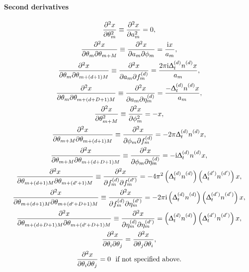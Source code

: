 \paragraph{Second derivatives}
\begin{subequations}
    \begin{gather}
        \xderivtwosame{\theta_{m}} \equiv
            \xderivtwosame{a_m} =
            0,
            \label{eq:amp-second-deriv}\\
        \xderivtwodiff{\theta_{m}}{\theta_{m + M}} \equiv
            \xderivtwodiff{a_m}{\phi_m} =
            \frac{\iu x}{a_m},\label{eq:amp-phi-second-deriv}\\
        \xderivtwodiff{\theta_{m}}{\theta_{m + (d + 1)M}} \equiv
            \xderivtwodiff{a_m^{\vphantom{(d)}}}{\fdm} =
            \frac{2 \pi \iu \Dtd \nd x}{a_m},\\
        \xderivtwodiff{\theta_{m}}{\theta_{m + (d + D + 1)M}} \equiv
            \xderivtwodiff{a_m^{\vphantom{(d)}}}{\etadm} =
            \frac{-\Dtd \nd x}{a_m},\\
        \xderivtwosame{\theta_{m + M}} \equiv
            \xderivtwosame{\phi_m} =
            -x,\\
        \xderivtwodiff{\theta_{m + M}}{\theta_{m + (d + 1)M}} \equiv
            \xderivtwodiff{\phi_m^{\vphantom{(d)}}}{\fdm} =
            -2 \pi \Dtd \nd x,\\
        \xderivtwodiff{\theta_{m + M}}{\theta_{m + (d + D + 1)M}} \equiv
            \xderivtwodiff{\phi_m^{\vphantom{(d)}}}{\etadm} =
            -\iu \Dtd \nd x,\\
        \xderivtwodiff{\theta_{m + (d + 1)M}}{\theta_{m + (d^{\prime} + 1)M}} \equiv
            \xderivtwodiff{\fdm}{\fdmp} =
            -4\pi^2 \left(\Dtd \nd \right) \left(\Dtdp \ndp \right) x,\\
        \xderivtwodiff{\theta_{m + (d + 1)M}}{\theta_{m + (d^{\prime} + D + 1)M}} \equiv
            \xderivtwodiff{\fdm}{\etadmp} =
            -2 \pi \iu \left(\Dtd \nd \right) \left(\Dtdp \ndp \right) x,\\
        \xderivtwodiff{\theta_{m + (d + D + 1)M}}{\theta_{m + (d^{\prime} + D + 1)M}} \equiv
            \xderivtwodiff{\etadm}{\etadmp} =
            \left(\Dtd \nd \right) \left(\Dtdp \ndp \right) x,\label{eq:damp-second-deriv}\\
        \xderivtwodiff{\theta_{i}}{\theta_{j}} =
            \xderivtwodiff{\theta_{j}}{\theta_{i}},
            \label{eq:symmetric-second-derivs}\\
        \xderivtwodiff{\theta_{i}}{\theta_{j}} = 0\ \text{ if not specified above.}
        \label{eq:zero-second-deriv}
    \end{gather}
    \label{eq:second-derivs}
\end{subequations}

